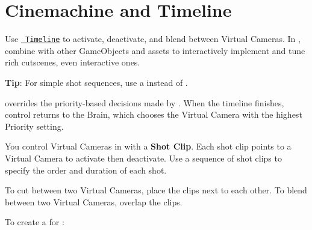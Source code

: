 \chapter{Cinemachine and Timeline}
\hypertarget{md__hey_tea_9_2_library_2_package_cache_2com_8unity_8cinemachine_0d2_89_87_2_documentation_0i_2_cinemachine_timeline}{}\label{md__hey_tea_9_2_library_2_package_cache_2com_8unity_8cinemachine_0d2_89_87_2_documentation_0i_2_cinemachine_timeline}
\label{md__hey_tea_9_2_library_2_package_cache_2com_8unity_8cinemachine_0d2_89_87_2_documentation_0i_2_cinemachine_timeline_autotoc_md725}%
%
 Use \href{https://docs.unity3d.com/Packages/com.unity.timeline@latest}{\texttt{ Timeline}} to activate, deactivate, and blend between Virtual Cameras. In , combine  with other Game\+Objects and assets to interactively implement and tune rich cutscenes, even interactive ones.

{\bfseries{Tip}}\+: For simple shot sequences, use a  instead of .

 overrides the priority-\/based decisions made by . When the timeline finishes, control returns to the  Brain, which chooses the Virtual Camera with the highest Priority setting.

You control Virtual Cameras in  with a {\bfseries{ Shot Clip}}. Each shot clip points to a Virtual Camera to activate then deactivate. Use a sequence of shot clips to specify the order and duration of each shot.

To cut between two Virtual Cameras, place the clips next to each other. To blend between two Virtual Cameras, overlap the clips.



To create a  for \+:


